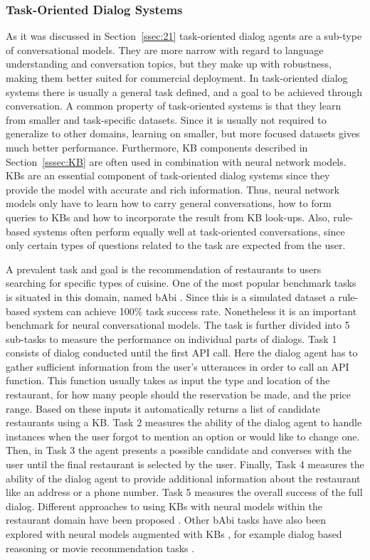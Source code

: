 \documentclass[12pt]{article}
\begin{document}
\subsubsection{Task-Oriented Dialog Systems} \label{sssec:task}
As it was discussed in Section~\ref{ssec:21} task-oriented dialog agents are a sub-type of conversational models. They are more narrow with regard to language understanding and conversation topics, but they make up with robustness, making them better suited for commercial deployment. In task-oriented dialog systems there is usually a general task defined, and a goal to be achieved through conversation. A common property of task-oriented systems is that they learn from smaller and task-specific datasets. Since it is usually not required to generalize to other domains, learning on smaller, but more focused datasets gives much better performance. Furthermore, KB components described in Section~\ref{sssec:KB} are often used in combination with neural network models. KBs are an essential component of task-oriented dialog systems since they provide the model with accurate and rich information. Thus, neural network models only have to learn how to carry general conversations, how to form queries to KBs and how to incorporate the result from KB look-ups. Also, rule-based systems often perform equally well at task-oriented conversations, since only certain types of questions related to the task are expected from the user.

A prevalent task and goal is the recommendation of restaurants to users searching for specific types of cuisine. One of the most popular benchmark tasks is situated in this domain, named bAbi \cite{Bordes:2016,Joshi:2017,bAbi}. Since this is a simulated dataset a rule-based system can achieve 100\(\%\) task success rate. Nonetheless it is an important benchmark for neural conversational models. The task is further divided into 5 sub-tasks to measure the performance on individual parts of dialogs. Task 1 consists of dialog conducted until the first API call. Here the dialog agent has to gather sufficient information from the user's utterances in order to call an API function. This function usually takes as input the type and location of the restaurant, for how many people should the reservation be made, and the price range. Based on these inputs it automatically returns a list of candidate restaurants using a KB. Task 2 measures the ability of the dialog agent to handle instances when the user forgot to mention an option or would like to change one. Then, in Task 3 the agent presents a possible candidate and converses with the user until the final restaurant is selected by the user. Finally, Task 4 measures the ability of the dialog agent to provide additional information about the restaurant like an address or a phone number. Task 5 measures the overall success of the full dialog. Different approaches to using KBs with neural models within the restaurant domain have been proposed \cite{Wen:2016,Eric:2017,Williams:2017}. Other bAbi tasks have also been explored with neural models augmented with KBs \cite{Williams:2017,Li_HIL:2016}, for example dialog based reasoning \cite{Weston:2015} or movie recommendation tasks \cite{Miller:2016,Dodge:2015}.
\end{document}
